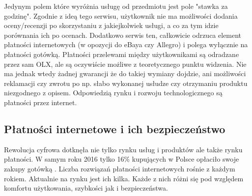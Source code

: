 \documentclass[12pt]{article}
\numberwithin{figure}{section}
\begin{document}
Jedynym polem które wyróżnia usługę od przedmiotu jest pole "stawka za godzinę". Zgodnie z ideą tego serwisu, użytkownik nie ma możliwości dodania oceny/recenzji po skorzystaniu z jakiejkolwiek usługi, a co za tym idzie porównania ich po ocenach. Dodatkowo serwis ten, całkowicie odrzuca element płatności internetowych (w opozycji do eBaya czy Allegro) i polega wyłącznie na płatności gotówką. Płatności przelewami między użytkownikami są odradzane przez sam OLX, ale są oczywiście możliwe z teoretycznego punktu widzenia. Nie ma jednak wtedy żadnej gwarancji że do takiej wymiany dojdzie, ani możliwości reklamacji czy zwrotu po np. słabo wykonanej usłudze czy otrzymaniu produktu niezgodnego z opisem. Odpowiedzią rynku i rozwoju technologicznego są płatności przez internet.

\subsection{Płatności internetowe i ich bezpieczeństwo} \label{sec:payments}
Rewolucja cyfrowa dotknęła nie tylko rynku usług i produktów ale także rynku płatności. W samym roku 2016 tylko 16\% kupujących w Polsce opłaciło swoje zakupy gotówką \cite{gotowka}. Liczba rozwiązań płatności internetowych rośnie z każdym rokiem. Aktualnie na rynku jest ich kilka. Każde z nich różni się pod względem komfortu użytkowania, szybkości jak i bezpieczeństwa. 

\end{document}
